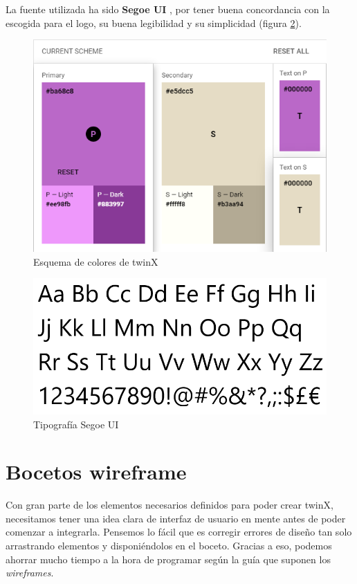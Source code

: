 La fuente utilizada ha sido \textbf{Segoe UI} \cite{segoeui}, por tener buena concordancia con la escogida para el logo, su buena legibilidad y su simplicidad (figura \ref{fig:segoeui}).

\begin{figure}
	\centering
	\includegraphics{img/esquema_colores}
	\caption{Esquema de colores de twinX}
	\label{fig:esquemacolores}
\end{figure}

\begin{figure}
	\centering
	\includegraphics{img/segoeui}
	\caption{Tipografía Segoe UI}
	\label{fig:segoeui}
\end{figure}


\section{Bocetos wireframe}

Con gran parte de los elementos necesarios definidos para poder crear twinX, necesitamos tener una idea clara de interfaz de usuario en mente antes de poder comenzar a integrarla. Pensemos lo fácil que es corregir errores de diseño tan solo arrastrando elementos y disponiéndolos en el boceto. Gracias a eso, podemos ahorrar mucho tiempo a la hora de programar según la guía que suponen los \textit{wireframes}.

